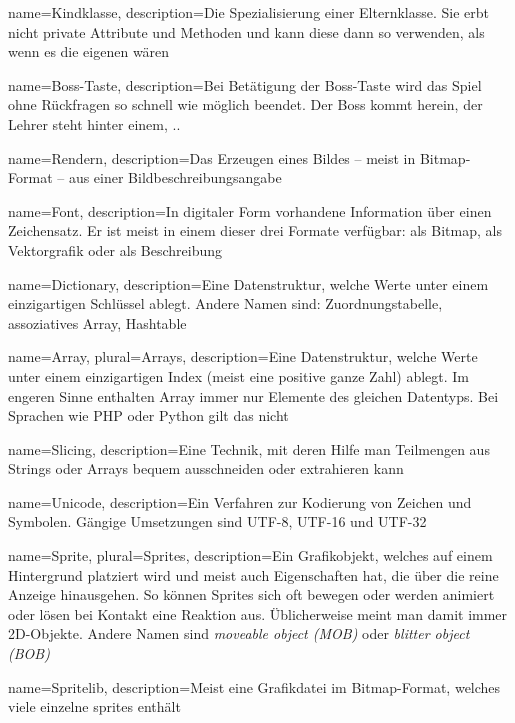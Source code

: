  {
 	name={Kindklasse},
 	description={Die Spezialisierung einer Elternklasse. Sie erbt nicht private Attribute und Methoden und kann diese dann so verwenden, als wenn es die eigenen wären} 
 }

{
	name={Boss-Taste},
	description={Bei Betätigung der Boss-Taste wird das Spiel ohne Rückfragen so schnell wie möglich beendet. Der Boss kommt herein, der Lehrer steht hinter einem, ..} 
}

{
	name={Rendern},
	description={Das Erzeugen eines Bildes -- meist in Bitmap-Format -- aus einer Bildbeschreibungsangabe} 
}

{
	name={Font},
	description={In digitaler Form vorhandene Information über einen Zeichensatz. Er ist meist in einem dieser drei Formate verfügbar: als Bitmap, als Vektorgrafik oder als Beschreibung} 
}

{
	name={Dictionary},
	description={Eine Datenstruktur, welche Werte unter einem einzigartigen Schlüssel ablegt. Andere Namen sind: Zuordnungstabelle, assoziatives Array, Hashtable} 
}

{
	name={Array},
    plural={Arrays},
	description={Eine Datenstruktur, welche Werte unter einem einzigartigen Index (meist eine positive ganze Zahl) ablegt. Im engeren Sinne enthalten Array immer nur Elemente des gleichen Datentyps. Bei Sprachen wie PHP oder Python gilt das nicht} 
}

{
	name={Slicing},
	description={Eine Technik, mit deren Hilfe man Teilmengen aus Strings oder Arrays bequem ausschneiden oder extrahieren kann} 
}

{
	name={Unicode},
	description={Ein Verfahren zur Kodierung von Zeichen und Symbolen. Gängige Umsetzungen sind UTF-8, UTF-16 und UTF-32} 
}

{
	name={Sprite},
    plural={Sprites},
	description={Ein Grafikobjekt, welches auf einem Hintergrund platziert wird und meist auch Eigenschaften hat, die über die reine Anzeige hinausgehen. So können Sprites sich oft bewegen oder werden animiert oder lösen bei Kontakt eine Reaktion aus. Üblicherweise meint man damit immer 2D-Objekte. Andere Namen sind \emph{moveable object (MOB)} oder \emph{blitter object (BOB)} } 
}

{
	name={Spritelib},
	description={Meist eine Grafikdatei im Bitmap-Format, welches viele einzelne \glspl{sprite} enthält} 
}

